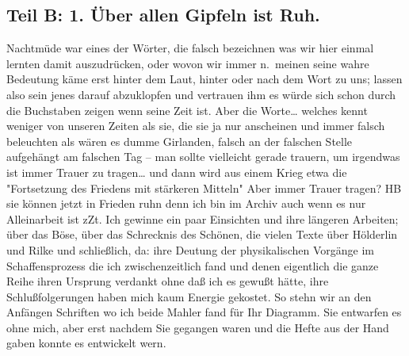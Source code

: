 \documentclass[
]{article}
\author{}
\date{\vspace{-2.5em}}
\begin{document}
\subsection{Teil B: 1. Über allen Gipfeln ist
Ruh.}\label{teil-b-1.-uxfcber-allen-gipfeln-ist-ruh.}

Nachtmüde war eines der Wörter, die falsch bezeichnen was wir hier
einmal lernten damit auszudrücken, oder wovon wir immer n.~meinen seine
wahre Bedeutung käme erst hinter dem Laut, hinter oder nach dem Wort zu
uns; lassen also sein jenes darauf abzuklopfen und vertrauen ihm es
würde sich schon durch die Buchstaben zeigen wenn seine Zeit ist. Aber
die Worte\ldots{} welches kennt weniger von unseren Zeiten als sie, die
sie ja nur anscheinen und immer falsch beleuchten als wären es dumme
Girlanden, falsch an der falschen Stelle aufgehängt am falschen Tag --
man sollte vielleicht gerade trauern, um irgendwas ist immer Trauer zu
tragen\ldots{} und dann wird aus einem Krieg etwa die "Fortsetzung des
Friedens mit stärkeren Mitteln" Aber immer Trauer tragen? HB sie können
jetzt in Frieden ruhn denn ich bin im Archiv auch wenn es nur
Alleinarbeit ist zZt. Ich gewinne ein paar Einsichten und ihre längeren
Arbeiten; über das Böse, über das Schrecknis des Schönen, die vielen
Texte über Hölderlin und Rilke und schließlich, da: ihre Deutung der
physikalischen Vorgänge im Schaffensprozess die ich zwischenzeitlich
fand und denen eigentlich die ganze Reihe ihren Ursprung verdankt ohne
daß ich es gewußt hätte, ihre Schlußfolgerungen haben mich kaum Energie
gekostet. So stehn wir an den Anfängen Schriften wo ich beide Mahler
fand für Ihr Diagramm. Sie entwarfen es ohne mich, aber erst nachdem Sie
gegangen waren und die Hefte aus der Hand gaben konnte es entwickelt
wern.
\end{document}
